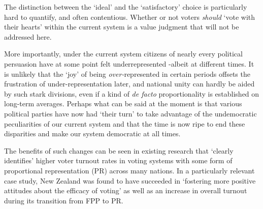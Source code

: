 \documentclass[DIV=calc, paper=a4, fontsize=11pt, twocolumn]{scrartcl}	 %
\begin{document}
The distinction between the `ideal' and the `satisfactory' choice is particularly hard to quantify, and often contentious.
Whether or not voters \emph{should} `vote with their hearts' within the current system is a value judgment that will not be addressed here. 


More importantly, under the current system citizens of nearly every political persuasion have at some point felt underrepresented \--albeit at different times. It is unlikely that the `joy' of being \emph{over-}represented in certain periods offsets the frustration of under-representation later, and
 national unity can hardly be aided by such stark divisions, even if a kind of \emph{ de facto} proportionality is established on long-term averages. 
Perhaps what can be said at the moment is that various political parties have now had `their turn' to take advantage of the undemocratic peculiarities of our current system and that the time is now ripe to end these disparities and make our system democratic at all times. 

The benefits of such changes can be seen in existing research that `clearly identifies' higher voter turnout rates in voting systems with some form of proportional representation (PR) \cite{Blais}
 across many nations. In a particularly relevant case study, New Zealand was found to have succeeded in `fostering more positive attitudes about the efficacy of voting' as well as an increase in overall turnout during its transition from FPP to PR\cite{NZ_PR_results}.
\end{document}
